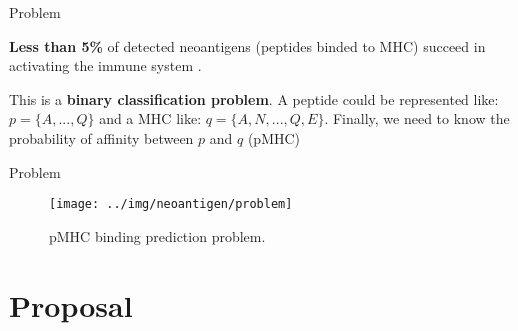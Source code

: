 \documentclass[10pt, aspectratio=169]{beamer}
\newcommand{\1}{
	\setbeamertemplate{background}{
		\texttt{[image: img/1]}
		\tikz[overlay] \fill[fill opacity=0.75,fill=white] (0,0) rectangle (-\paperwidth,\paperheight);
	}
}
\begin{document}
	\begin{frame}{Problem}{}
		
		\begin{block}{}
			\textbf{Less than 5\%} of detected neoantigens (peptides binded to MHC) succeed in activating the immune system \cite{de2020neoantigen}.
		\end{block}
		
		
		\begin{block}{}
			This is a \textbf{binary classification problem}. A peptide could be represented like: $p = \{ A, ... , Q \}$ and a MHC like: $q = \{ A, N, ... ,Q, E \}$. Finally, we need to know the probability of affinity between $p$ and $q$ (pMHC)
		\end{block}
		
		
	\end{frame}
	
	\begin{frame}{Problem}{}	
		\begin{figure}
			\texttt{[image: ../img/neoantigen/problem]}
			\caption{pMHC binding prediction problem.}
		\end{figure}
	\end{frame}
	

	
	\section{Proposal}
	
\end{document}
